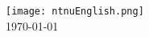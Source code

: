 \begin{titlepage}




\texttt{[image: ntnuEnglish.png]}\\[1.5cm] %


{\large \today}\\[3cm] %


\vfill %

\end{titlepage}
